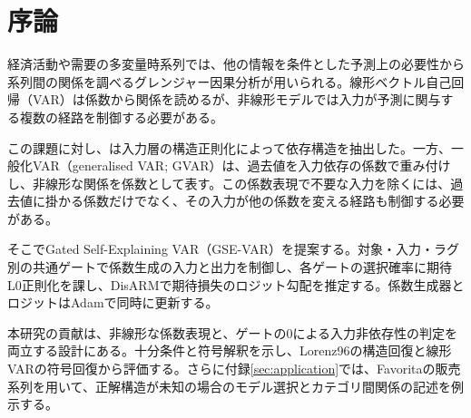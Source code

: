\section{序論}
\label{sec:introduction}
経済活動や需要の多変量時系列では、他の情報を条件とした予測上の必要性から系列間の関係を調べるグレンジャー因果分析が用いられる\citep{granger1969}。線形ベクトル自己回帰（VAR）は係数から関係を読めるが、非線形モデルでは入力が予測に関与する複数の経路を制御する必要がある。

この課題に対し、\citet{tank2022}は入力層の構造正則化によって依存構造を抽出した。一方、一般化VAR（generalised VAR; GVAR）は、過去値を入力依存の係数で重み付けし、非線形な関係を係数として表す\citep{marcinkevics2021}。この係数表現で不要な入力を除くには、過去値に掛かる係数だけでなく、その入力が他の係数を変える経路も制御する必要がある。

そこでGated Self-Explaining VAR（GSE-VAR）を提案する。対象・入力・ラグ別の共通ゲートで係数生成の入力と出力を制御し、各ゲートの選択確率に期待L0正則化を課し、DisARMで期待損失のロジット勾配を推定する。係数生成器とロジットはAdamで同時に更新する。

本研究の貢献は、非線形な係数表現と、ゲートの\(0\)による入力非依存性の判定を両立する設計にある。十分条件と符号解釈を示し、Lorenz96の構造回復と線形VARの符号回復から評価する。さらに付録\ref{sec:application}では、Favoritaの販売系列を用いて、正解構造が未知の場合のモデル選択とカテゴリ間関係の記述を例示する。

